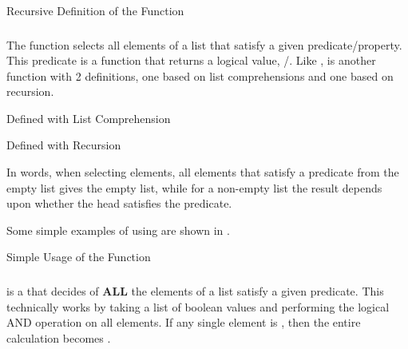 \begin{listing}[h!tbp]
\caption{Recursive Definition of the  Function}
\label{lst:Map_Recursive_Definition}
\end{listing}

\subsubsection{\texorpdfstring{}{\texttt{filter}}}\label{subsubsec:Filter_Function}
The  function selects all elements of a list that satisfy a given predicate/property.
This predicate is a function that returns a logical value, /.
Like ,  is another function with 2 definitions, one based on list comprehensions and one based on recursion.

\begin{listing}[h!tbp]
\caption{ Defined with List Comprehension}
\label{lst:Filter_List_Comprehension_Definition}
\end{listing}

\begin{listing}[h!tbp]
\caption{ Defined with Recursion}
\label{lst:Filter_Recursive_Definition}
\end{listing}
In words,  when selecting elements, all elements that satisfy a predicate from the empty list gives the empty list, while for a non-empty list the result depends upon whether the head satisfies the predicate.

Some simple examples of using  are shown in .
\begin{listing}[h!tbp]
\caption{Simple Usage of the  Function}
\label{lst:Filter_Usage-Simple}
\end{listing}

\subsubsection{\texorpdfstring{}{\texttt{all}}}\label{subsubsec:All_Function}
 is a  that decides of \textbf{ALL} the elements of a list satisfy a given predicate.
This technically works by taking a list of boolean values and performing the logical AND operation on all elements.
If any single element is , then the entire calculation becomes .

